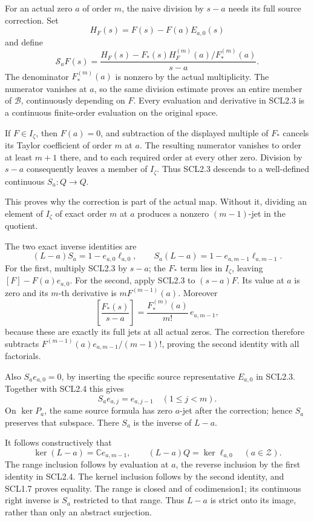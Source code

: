 For an actual zero \(a\) of order \(m\), the naive division by \(s-a\)
needs its full source correction. Set \[
 H_F(s)=F(s)-F(a)E_{a,0}(s)
\] and define \[
 \boxed{
 \mathscr S_aF(s)=
 \frac{H_F(s)-F_*(s)H_F^{(m)}(a)/F_*^{(m)}(a)}
      {s-a}.}
 \tag{SCL2.3}
\] The denominator \(F_*^{(m)}(a)\) is nonzero by the actual
multiplicity. The numerator vanishes at \(a\), so the same division
estimate proves an entire member of \(\mathcal B\), continuously
depending on \(F\). Every evaluation and derivative in SCL2.3 is a
continuous finite-order evaluation on the original space.

If \(F\in I_\zeta\), then \(F(a)=0\), and subtraction of the displayed
multiple of \(F_*\) cancels its Taylor coefficient of order \(m\) at
\(a\). The resulting numerator vanishes to order at least \(m+1\) there,
and to each required order at every other zero. Division by \(s-a\)
consequently leaves a member of \(I_\zeta\). Thus SCL2.3 descends to a
well-defined continuous \(S_a:Q\to Q\).

This proves why the correction is part of the actual map. Without it,
dividing an element of \(I_\zeta\) of exact order \(m\) at \(a\)
produces a nonzero \((m-1)\)-jet in the quotient.

The two exact inverse identities are \[
 \boxed{
 (L-a)S_a=1-e_{a,0}\ell_{a,0},\qquad
 S_a(L-a)=1-e_{a,m-1}\ell_{a,m-1}.}
 \tag{SCL2.4}
\] For the first, multiply SCL2.3 by \(s-a\); the \(F_*\) term lies in
\(I_\zeta\), leaving \([F]-F(a)e_{a,0}\). For the second, apply SCL2.3
to \((s-a)F\). Its value at \(a\) is zero and its \(m\)-th derivative is
\(mF^{(m-1)}(a)\). Moreover \[
 \left[\frac{F_*(s)}{s-a}\right]
 =\frac{F_*^{(m)}(a)}{m!}\,e_{a,m-1},
\] because these are exactly its full jets at all actual zeros. The
correction therefore subtracts \(F^{(m-1)}(a)e_{a,m-1}/(m-1)!\), proving
the second identity with all factorials.

Also \(S_ae_{a,0}=0\), by inserting the specific source representative
\(E_{a,0}\) in SCL2.3. Together with SCL2.4 this gives \[
 S_ae_{a,j}=e_{a,j-1}\quad(1\le j<m).
 \tag{SCL2.5}
\] On \(\ker P_a\), the same source formula has zero \(a\)-jet after the
correction; hence \(S_a\) preserves that subspace. There \(S_a\) is the
inverse of \(L-a\).

It follows constructively that \[
 \ker(L-a)=\mathbb C e_{a,m-1},\qquad
 (L-a)Q=\ker\ell_{a,0}\quad(a\in\mathscr Z).
 \tag{SCL2.6}
\] The range inclusion follows by evaluation at \(a\), the reverse
inclusion by the first identity in SCL2.4. The kernel inclusion follows
by the second identity, and SCL1.7 proves equality. The range is closed
and of codimension1; its continuous right inverse is \(S_a\) restricted
to that range. Thus \(L-a\) is strict onto its image, rather than only
an abstract surjection.

